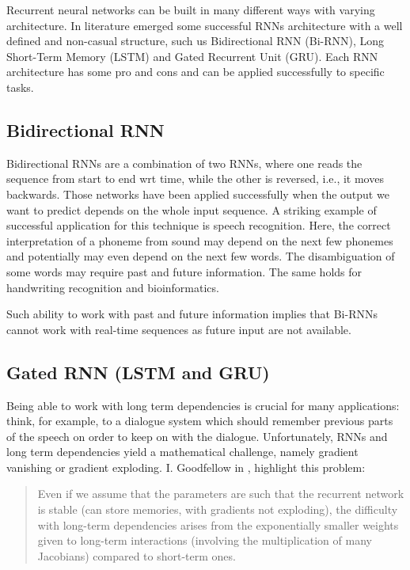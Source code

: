 Recurrent neural networks can be built in many different ways with
varying architecture. In literature emerged some successful RNNs
architecture with a well defined and non-casual structure, such us
Bidirectional RNN (Bi-RNN), Long Short-Term Memory (LSTM) and Gated
Recurrent Unit (GRU). Each RNN architecture has some pro and cons and
can be applied successfully to specific tasks.

\subsection{Bidirectional RNN}

Bidirectional RNNs are a combination of two RNNs, where one reads the
sequence from start to end wrt time, while the other is reversed,
i.e., it moves backwards. Those networks have been applied
successfully when the output we want to predict depends on the whole
input sequence. A striking example of successful application for this
technique is speech recognition. Here, the correct interpretation of a
phoneme from sound may depend on the next few phonemes and potentially
may even depend on the next few words. The disambiguation of some
words may require past and future information. The same holds for
handwriting recognition and bioinformatics.

Such ability to work with past and future information implies that
Bi-RNNs cannot work with real-time sequences as future input are not
available.

\subsection{Gated RNN (LSTM and GRU)}
\label{subsec:gated-rnn}

Being able to work with long term dependencies is crucial for many
applications: think, for example, to a dialogue system which should
remember previous parts of the speech on order to keep on with the
dialogue. Unfortunately, RNNs and long term dependencies yield a
mathematical challenge, namely gradient vanishing or gradient
exploding. I. Goodfellow \etal{} in \cite{goodfellow2016deep},
highlight this problem:

\begin{quote}
  Even if we assume that the parameters are such that the recurrent
  network is stable (can store memories, with gradients not
  exploding), the difficulty with long-term dependencies arises from
  the exponentially smaller weights given to long-term interactions
  (involving the multiplication of many Jacobians) compared to
  short-term ones.
\end{quote}

